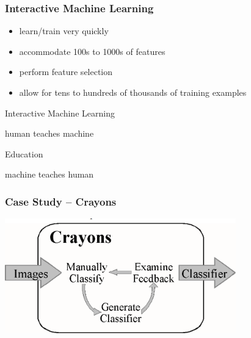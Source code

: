 \documentclass[xcolor=svgnames]{beamer}
\begin{document}
\begin{frame}
	\frametitle{Interactive Machine Learning}
	\begin{itemize}
		\item learn/train very quickly
		\item accommodate 100s to 1000s of features
		\item	perform feature selection
		\item allow for tens to hundreds of thousands of training examples
	\end{itemize}
\end{frame}
\begin{frame}
	\begin{center}
		{\Huge Interactive Machine Learning}

		\medskip
		human teaches machine

		\bigskip
		\bigskip
		\bigskip
		\bigskip

		{\Huge Education}

		\medskip
		machine teaches human
	\end{center}
\end{frame}
\begin{frame}
	\frametitle{Case Study -- Crayons}
	\begin{center}
		\includegraphics[width=0.75\textwidth]{img/crayons-diagram.png}
	\end{center}
\end{frame}
\end{document}
